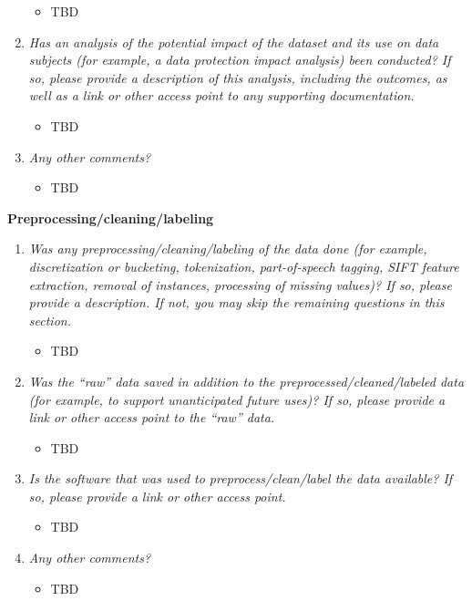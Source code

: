\documentclass[
  letterpaper,
  DIV=11,
  numbers=noendperiod]{scrartcl}
\providecommand{\tightlist}{%
  \setlength{\itemsep}{0pt}\setlength{\parskip}{0pt}}\usepackage{longtable,booktabs,array}
\begin{document}
\begin{enumerate}
  \begin{itemize}
  \tightlist
  \item
    TBD
  \end{itemize}
\item
  \emph{Has an analysis of the potential impact of the dataset and its
  use on data subjects (for example, a data protection impact analysis)
  been conducted? If so, please provide a description of this analysis,
  including the outcomes, as well as a link or other access point to any
  supporting documentation.}

  \begin{itemize}
  \tightlist
  \item
    TBD
  \end{itemize}
\item
  \emph{Any other comments?}

  \begin{itemize}
  \tightlist
  \item
    TBD
  \end{itemize}
\end{enumerate}

\textbf{Preprocessing/cleaning/labeling}

\begin{enumerate}
\def\labelenumi{\arabic{enumi}.}
\tightlist
\item
  \emph{Was any preprocessing/cleaning/labeling of the data done (for
  example, discretization or bucketing, tokenization, part-of-speech
  tagging, SIFT feature extraction, removal of instances, processing of
  missing values)? If so, please provide a description. If not, you may
  skip the remaining questions in this section.}

  \begin{itemize}
  \tightlist
  \item
    TBD
  \end{itemize}
\item
  \emph{Was the ``raw'' data saved in addition to the
  preprocessed/cleaned/labeled data (for example, to support
  unanticipated future uses)? If so, please provide a link or other
  access point to the ``raw'' data.}

  \begin{itemize}
  \tightlist
  \item
    TBD
  \end{itemize}
\item
  \emph{Is the software that was used to preprocess/clean/label the data
  available? If so, please provide a link or other access point.}

  \begin{itemize}
  \tightlist
  \item
    TBD
  \end{itemize}
\item
  \emph{Any other comments?}

  \begin{itemize}
  \tightlist
  \item
    TBD
  \end{itemize}
\end{enumerate}
\end{document}
